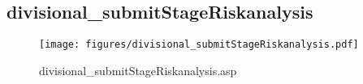 \subsection{divisional\_submitStageRiskanalysis}
\begin{figure}[htb]
    \begin{center}
        \texttt{[image: figures/divisional\_submitStageRiskanalysis.pdf]}
    \end{center}
    \caption{divisional\_submitStageRiskanalysis.asp}
    \label{fig:divisional_submitStageRiskanalysis}
\end{figure}
